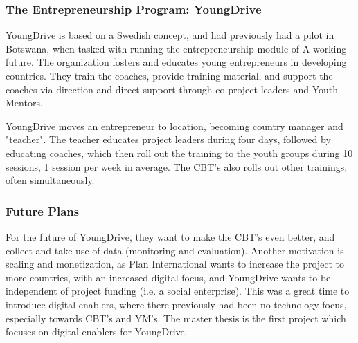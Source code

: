 \subsubsection{The Entrepreneurship Program: YoungDrive}

YoungDrive is based on a Swedish concept, and had previously had a pilot in Botswana, when tasked with running the entrepreneurship module of A working future. The organization fosters and educates young entrepreneurs in developing countries. They train the coaches, provide training material, and support the coaches via direction and direct support through co-project leaders and Youth Mentors.

YoungDrive moves an entrepreneur to location, becoming country manager and "teacher". The teacher educates project leaders during four days, followed by educating coaches, which then roll out the training to the youth groups during 10 sessions, 1 session per week in average. The CBT's also rolls out other trainings, often simultaneously.

\subsubsection{Future Plans}

For the future of YoungDrive, they want to make the CBT's even better, and collect and take use of data (monitoring and evaluation). Another motivation is scaling and monetization, as Plan International wants to increase the project to more countries, with an increased digital focus, and YoungDrive wants to be independent of project funding (i.e. a social enterprise). This was a great time to introduce digital enablers, where there previously had been no technology-focus, especially towards CBT's and YM's. The master thesis is the first project which focuses on digital enablers for YoungDrive.
